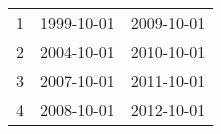 % 
\begin{tabular}{ccc}
  \hline
  \hline
1 & 1999-10-01 & 2009-10-01 \\ 
  2 & 2004-10-01 & 2010-10-01 \\ 
  3 & 2007-10-01 & 2011-10-01 \\ 
  4 & 2008-10-01 & 2012-10-01 \\ 
   \hline
\end{tabular}
